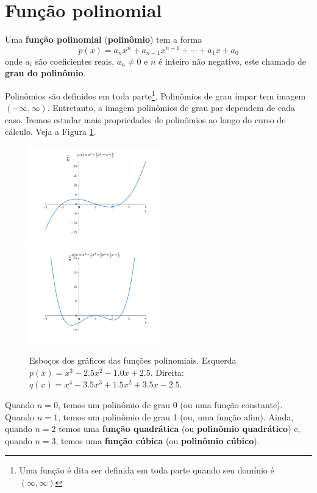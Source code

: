 \documentclass[../main.tex]{subfiles}
\begin{document}
\section{Função polinomial}\label{sec:FuncPolinomiais}

Uma {\bf função polinomial} ({\bf polinômio}) tem a forma
\begin{equation}
  p(x) = a_nx^n + a_{n-1}x^{n-1} + \cdots + a_1x + a_0
\end{equation}
onde $a_i$ são coeficientes reais, $a_n\neq 0$ e $n$ é inteiro não negativo, este chamado de {\bf grau do polinômio}.

Polinômios são definidos em toda parte\footnote{Uma função é dita ser definida em toda parte quando seu domínio é $(\infty, \infty)$}. Polinômios de grau ímpar tem imagem $(-\infty, \infty)$. Entretanto, a imagem polinômios de grau par dependem de cada caso. Iremos estudar mais propriedades de polinômios ao longo do curso de cálculo. Veja a Figura \ref{fig:poli_graficos}.
\begin{figure}[H]
  \centering
  \includegraphics[width=0.5\textwidth]{fig_func/fig_poli_impar}~
    \includegraphics[width=0.5\textwidth]{fig_func/fig_poli_par}
  \caption{Esboços dos gráficos das funções polinomiais. Esquerda $p(x) = x^{3} - 2.5 x^{2} - 1.0 x + 2.5$. Direita: $q(x) = x^{4} - 3.5 x^{3} + 1.5 x^{2} + 3.5 x - 2.5$.}
  \label{fig:poli_graficos}
\end{figure}

Quando $n=0$, temos um polinômio de grau 0 (ou uma função constante). Quando $n=1$, temos um polinômio de grau 1 (ou, uma função afim). Ainda, quando $n=2$ temos uma {\bf função quadrática} (ou {\bf polinômio quadrático}) e, quando $n=3$, temos uma {\bf função cúbica} (ou {\bf polinômio cúbico}).
\end{document}

